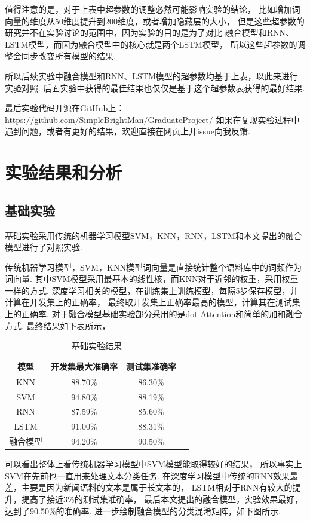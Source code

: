 \documentclass[bachelor,adobefonts]{jnuthesis}
\begin{document}
值得注意的是，对于上表中超参数的调整必然可能影响实验的结论，
比如增加词向量的维度从50维度提升到200维度，或者增加隐藏层的大小，
但是这些超参数的研究并不在实验讨论的范围中，因为实验的目的是为了对比
融合模型和RNN、LSTM模型，而因为融合模型中的核心就是两个LSTM模型，
所以这些超参数的调整会同步改变所有模型的结果.

所以后续实验中融合模型和RNN、LSTM模型的超参数均基于上表，以此来进行实验对照.
后面实验中获得的最佳结果也仅仅是基于这个超参数表获得的最好结果.

最后实验代码开源在GitHub上：https://github.com/SimpleBrightMan/GraduateProject/
如果在复现实验过程中遇到问题，或者有更好的结果，欢迎直接在网页上开issue向我反馈.

\section{实验结果和分析}
\subsection{基础实验}
基础实验采用传统的机器学习模型SVM，KNN，RNN，LSTM和本文提出的融合模型进行了对照实验.

传统机器学习模型，SVM，KNN模型词向量是直接统计整个语料库中的词频作为词向量.
其中SVM模型采用最基本的线性核，而KNN对于近邻的权重，采用权重一样的方式.
深度学习相关的模型，在训练集上训练模型，每隔5步保存模型，并计算在开发集上的正确率，
最终取开发集上正确率最高的模型，计算其在测试集上的正确率.
对于融合模型基础实验部分采用的是dot Attention和简单的加和融合方式.
最终结果如下表所示，

\begin{table}[h!]
  \centering
  \begin{tabular}{cccc}
    \toprule
    \textbf{模型} & \textbf{开发集最大准确率} & \textbf{测试集准确率} \\
    \midrule
    KNN & 88.70\% & 86.30\% \\
    SVM & 94.80\% & 88.19\% \\
    RNN & 87.59\% & 85.60\% \\
    LSTM & 91.00\% & 88.31\% \\
    融合模型 & 94.20\% & 90.50\% \\
    \bottomrule
  \end{tabular}
  \caption{基础实验结果}
\end{table}


可以看出整体上看传统机器学习模型中SVM模型能取得较好的结果，
所以事实上SVM在先前也一直用来处理文本分类任务.
在深度学习模型中传统的RNN效果最差，主要是因为新闻语料的文本是属于长文本的，
LSTM相对于RNN有较大的提升，提高了接近3\%的测试集准确率，
最后本文提出的融合模型，实验效果最好，达到了90.50\%的准确率.
进一步绘制融合模型的分类混淆矩阵，如下图所示.
\end{document}

